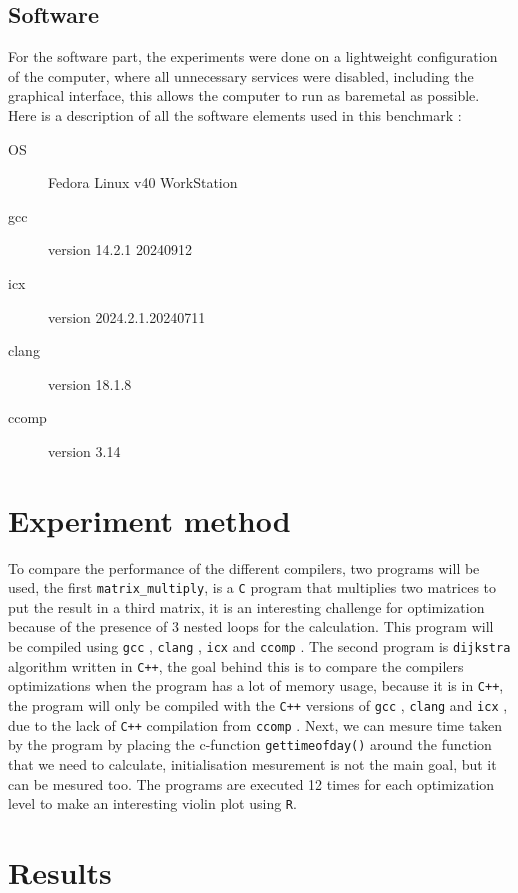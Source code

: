\documentclass{rapport}
\newcommand{\gcc}{\texttt{gcc} }
\newcommand{\icx}{\texttt{icx} }
\newcommand{\clang}{\texttt{clang} }
\newcommand{\comp}{\texttt{ccomp} }
\begin{document}
\subsection*{Software}
For the software part, the experiments were done on a lightweight configuration of the computer, where all unnecessary services were disabled, 
including the graphical interface, this allows the computer to run as baremetal as possible. \newline
Here is a description of all the software elements used in this benchmark :
\begin{description}
    \item[OS] Fedora Linux v40 WorkStation
    \item[gcc] version 14.2.1 20240912
    \item[icx] version 2024.2.1.20240711
    \item[clang] version 18.1.8
    \item[ccomp] version 3.14
\end{description}

\section{Experiment method}
To compare the performance of the different compilers, two programs will be used, the first \texttt{matrix\_multiply}, is a \texttt{C} program 
that multiplies two matrices to put the result in a third matrix, it is an interesting challenge for optimization because of the presence of 3 nested loops for 
the calculation. This program will be compiled using \gcc, \clang, \icx and \comp. \newline
The second program is \texttt{dijkstra} algorithm written in \texttt{C++}, the goal behind this is to compare the compilers optimizations when the program has a lot
of memory usage, because it is in \texttt{C++}, the program will only be compiled with the \texttt{C++} versions of \gcc, \clang and \icx, due to the lack of \texttt{C++}
compilation from \comp. \newline
Next, we can mesure time taken by the program by placing the c-function \texttt{gettimeofday()} around the function that we need to calculate, initialisation 
mesurement is not the main goal, but it can be mesured too. The programs are executed 12 times for each optimization level to make an interesting violin plot using \texttt{R}.

\section{Results}
\end{document}
